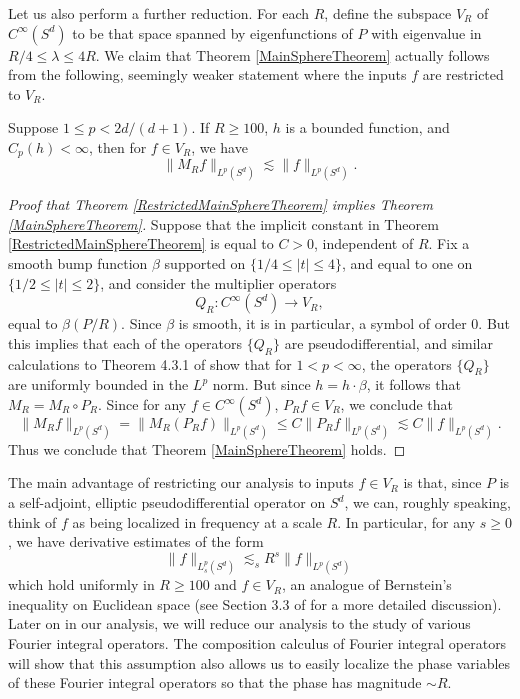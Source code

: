 Let us also perform a further reduction. For each $R$, define the subspace $V_R$ of $C^\infty(S^d)$ to be that space spanned by eigenfunctions of $P$ with eigenvalue in $R/4 \leq \lambda \leq 4R$. We claim that Theorem \ref{MainSphereTheorem} actually follows from the following, seemingly weaker statement where the inputs $f$ are restricted to $V_R$.

\begin{theorem} \label{RestrictedMainSphereTheorem}
    Suppose $1 \leq p < 2d/(d+1)$. If $R \geq 100$, $h$ is a bounded function, and $C_p(h) < \infty$, then for $f \in V_R$, we have
    \[ \| M_R f \|_{L^p(S^d)} \lesssim \| f \|_{L^p(S^d)}. \]
\end{theorem}

\begin{proof}[Proof that Theorem \ref{RestrictedMainSphereTheorem} implies Theorem \ref{MainSphereTheorem}]
    Suppose that the implicit constant in Theorem \ref{RestrictedMainSphereTheorem} is equal to $C > 0$, independent of $R$. Fix a smooth bump function $\beta$ supported on $\{ 1/4 \leq |t| \leq 4 \}$, and equal to one on $\{ 1/2 \leq |t| \leq 2 \}$, and consider the multiplier operators
    \[ Q_R: C^\infty(S^d) \to V_R, \]
    equal to $\beta( P / R )$. Since $\beta$ is smooth, it is in particular, a symbol of order $0$. But this implies that each of the operators $\{ Q_R \}$ are pseudodifferential, and similar calculations to Theorem 4.3.1 of \cite{Sogge} show that for $1 < p < \infty$, the operators $\{ Q_R \}$ are uniformly bounded in the $L^p$ norm. But since $h = h \cdot \beta$, it follows that $M_R = M_R \circ P_R$. Since for any $f \in C^\infty(S^d)$, $P_R f \in V_R$, we conclude that
    \[ \| M_R f \|_{L^p(S^d)} = \| M_R (P_R f) \|_{L^p(S^d)} \leq C \| P_R f \|_{L^p(S^d)} \lesssim C \| f \|_{L^p(S^d)}. \]
    Thus we conclude that Theorem \ref{MainSphereTheorem} holds.
\end{proof}

The main advantage of restricting our analysis to inputs $f \in V_R$ is that, since $P$ is a self-adjoint, elliptic pseudodifferential operator on $S^d$, we can, roughly speaking, think of $f$ as being localized in frequency at a scale $R$. In particular, for any $s \geq 0$, we have derivative estimates of the form
%
\begin{equation} \label{ManifoldBernsteinInequality}
    \| f \|_{L^p_s(S^d)} \lesssim_s R^s \| f \|_{L^p(S^d)}
\end{equation}
%
which hold uniformly in $R \geq 100$ and $f \in V_R$, an analogue of Bernstein's inequality on Euclidean space (see Section 3.3 of \cite{Sogge} for a more detailed discussion). Later on in our analysis, we will reduce our analysis to the study of various Fourier integral operators. The composition calculus of Fourier integral operators will show that this assumption also allows us to easily localize the phase variables of these Fourier integral operators so that the phase has magnitude $\sim R$.

